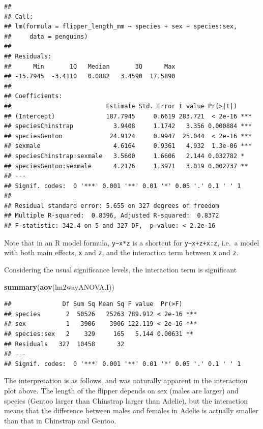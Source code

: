 \documentclass[
]{book}
\newenvironment{Shaded}{\begin{snugshade}}{\end{snugshade}}
\newcommand{\FunctionTok}[1]{\textcolor[rgb]{0.13,0.29,0.53}{\textbf{#1}}}
\newcommand{\NormalTok}[1]{#1}
\begin{document}
\begin{verbatim}
## 
## Call:
## lm(formula = flipper_length_mm ~ species + sex + species:sex, 
##     data = penguins)
## 
## Residuals:
##      Min       1Q   Median       3Q      Max 
## -15.7945  -3.4110   0.0882   3.4590  17.5890 
## 
## Coefficients:
##                          Estimate Std. Error t value Pr(>|t|)    
## (Intercept)              187.7945     0.6619 283.721  < 2e-16 ***
## speciesChinstrap           3.9408     1.1742   3.356 0.000884 ***
## speciesGentoo             24.9124     0.9947  25.044  < 2e-16 ***
## sexmale                    4.6164     0.9361   4.932  1.3e-06 ***
## speciesChinstrap:sexmale   3.5600     1.6606   2.144 0.032782 *  
## speciesGentoo:sexmale      4.2176     1.3971   3.019 0.002737 ** 
## ---
## Signif. codes:  0 '***' 0.001 '**' 0.01 '*' 0.05 '.' 0.1 ' ' 1
## 
## Residual standard error: 5.655 on 327 degrees of freedom
## Multiple R-squared:  0.8396, Adjusted R-squared:  0.8372 
## F-statistic: 342.4 on 5 and 327 DF,  p-value: < 2.2e-16
\end{verbatim}

Note that in an R model formula, \texttt{y\textasciitilde{}x*z} is a shortcut for \texttt{y\textasciitilde{}x+z+x:z}, i.e.~a model with both main effects, \texttt{x} and \texttt{z}, and the interaction term between \texttt{x} and \texttt{z}.

Considering the usual significance levels, the interaction term is significant

\begin{Shaded}
\begin{Highlighting}[]
\FunctionTok{summary}\NormalTok{(}\FunctionTok{aov}\NormalTok{(lm2wayANOVA.I))}
\end{Highlighting}
\end{Shaded}

\begin{verbatim}
##              Df Sum Sq Mean Sq F value  Pr(>F)    
## species       2  50526   25263 789.912 < 2e-16 ***
## sex           1   3906    3906 122.119 < 2e-16 ***
## species:sex   2    329     165   5.144 0.00631 ** 
## Residuals   327  10458      32                    
## ---
## Signif. codes:  0 '***' 0.001 '**' 0.01 '*' 0.05 '.' 0.1 ' ' 1
\end{verbatim}

The interpretation is as follows, and was naturally apparent in the interaction plot above. The length of the flipper depends on sex (males are larger) and species (Gentoo larger than Chinstrap larger than Adelie), but the interaction means that the difference between males and females in Adelie is actually smaller than that in Chinstrap and Gentoo.
\end{document}
